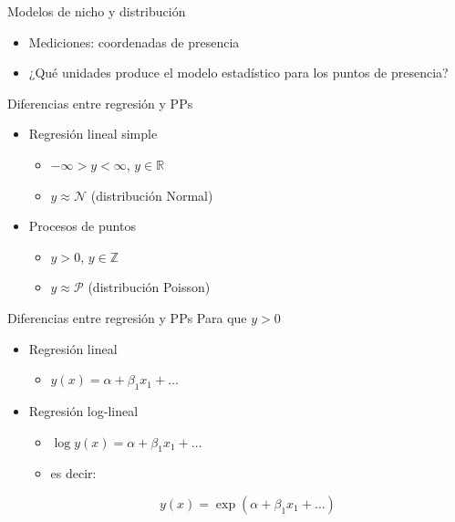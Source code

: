 \documentclass[
  11pt,
  ignorenonframetext,
]{beamer}
\providecommand{\tightlist}{%
  \setlength{\itemsep}{0pt}\setlength{\parskip}{0pt}}
\begin{document}
\begin{frame}{Modelos de nicho y distribución}
\protect\hypertarget{modelos-de-nicho-y-distribuciuxf3n}{}
\begin{itemize}
\item
  Mediciones: coordenadas de presencia
\item
  ¿Qué unidades produce el modelo estadístico para los puntos de
  presencia?
\end{itemize}
\end{frame}

\begin{frame}{Diferencias entre regresión y PPs}
\protect\hypertarget{diferencias-entre-regresiuxf3n-y-pps}{}
\begin{itemize}
\item
  Regresión lineal simple

  \begin{itemize}
  \tightlist
  \item
    \(-\infty > y < \infty\), \(y \in \mathbb{R}\)
  \item
    \(y \approx \mathcal{N}\) (distribución Normal)
  \end{itemize}
\item
  Procesos de puntos

  \begin{itemize}
  \tightlist
  \item
    \(y > 0\), \(y \in \mathbb{Z}\)
  \item
    \(y \approx \mathcal{P}\) (distribución Poisson)
  \end{itemize}
\end{itemize}
\end{frame}

\begin{frame}{Diferencias entre regresión y PPs}
\protect\hypertarget{diferencias-entre-regresiuxf3n-y-pps-1}{}
Para que \(y >0\)

\begin{itemize}
\item
  Regresión lineal

  \begin{itemize}
  \tightlist
  \item
    \(y(x) = \alpha + \beta_1 x_1 + \dots\)
  \end{itemize}
\item
  Regresión log-lineal

  \begin{itemize}
  \item
    \(\log y(x) = \alpha + \beta_1 x_1 + \dots\)
  \item
    es decir:
  \end{itemize}

  \[y(x)  = \exp(\alpha + \beta_1 x_1 + \dots)\]
\end{itemize}
\end{frame}
\end{document}
